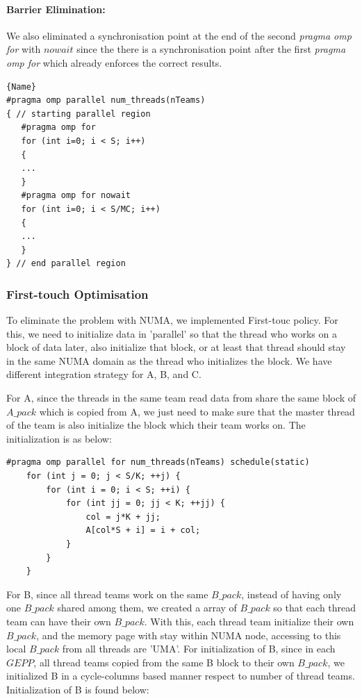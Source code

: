 \documentclass[article]{scrartcl}
\begin{document}
\paragraph{Barrier Elimination:}
We also eliminated a synchronisation point at the end of the second \textit{pragma omp for} with $nowait$ since the there is a synchronisation point after the first \textit{pragma omp for} which already enforces the correct results.

    \noindent\begin{minipage}{.70\textwidth}
        \begin{lstlisting}[caption=Barrier Elimination,frame=single]{Name}
#pragma omp parallel num_threads(nTeams)
{ // starting parallel region
   #pragma omp for
   for (int i=0; i < S; i++)
   {
   ...
   }
   #pragma omp for nowait
   for (int i=0; i < S/MC; i++)
   {
   ...
   }
} // end parallel region
        \end{lstlisting}
        \end{minipage}


\subsubsection{First-touch Optimisation}
To eliminate the problem with NUMA, we implemented First-touc policy. For this, we need to initialize data in 'parallel' so that the thread who works on a block of data later, also initialize that block, or at least that thread should stay in the same NUMA domain as the thread who initializes the block. We have different integration strategy for A, B, and C.

For A, since the threads in the same team read data from share the same block of $A\_pack$ which is copied from A, we just need to make sure that the master thread of the team is also initialize the block which their team works on. The initialization is as below:
\begin{lstlisting}[frame=single]
#pragma omp parallel for num_threads(nTeams) schedule(static)
    for (int j = 0; j < S/K; ++j) {
        for (int i = 0; i < S; ++i) {
            for (int jj = 0; jj < K; ++jj) {
                col = j*K + jj;
                A[col*S + i] = i + col;
            }
        }
    }
\end{lstlisting}

For B, since all thread teams work on the same $B\_pack$, instead of having only one $B\_pack$ shared among them, we created a array of $B\_pack$ so that each thread team can have their own $B\_pack$. With this, each thread team initialize their own $B\_pack$, and the memory page with stay within NUMA node, accessing to this local $B\_pack$ from all threads are 'UMA'. For initialization of B, since in each $GEPP$, all thread teams copied from the same B block to their own $B\_pack$, we initialized B in a cycle-columns based manner respect to number of thread teams. Initialization of B is found below:
\end{document}
